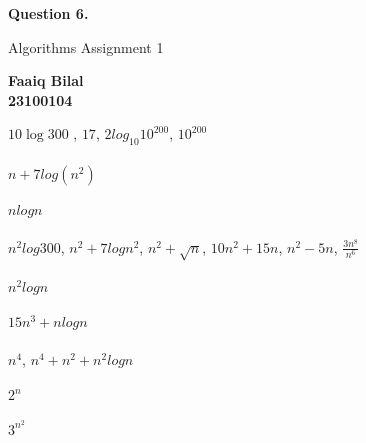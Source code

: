 \documentclass[]{article}
\begin{document}
\begin{center}
    \vspace*{1cm}

    \textbf{Question 6.}

    \vspace{0.5cm}
     Algorithms Assignment 1

    \vspace{0.15cm}

    \textbf{Faaiq Bilal} \\ 
    \textbf{23100104}
         
\end{center}
$10 \log 300 $ , $17$, $2log_{10} 10^{200}$, $10^{200}$ \\ \\
$ n + 7 log(n^2) $ \\ \\
$ n log n$ \\ \\
$ n^2 log 300 $, $n^2 + 7 log n^2$, $n^2 + \sqrt{n}$, $10n^2 + 15n$, $n^2-5n$, $ \frac{3n^8}{n^6} $ \\ \\
$ n^2 log n$ \\ \\
$ 15 n^3 + n log n $ \\ \\
$ n^4 $, $n^4 + n^2 + n^2 log n$ \\ \\
$ 2^n$ \\ \\ 
$3^{n^2}$ 
\end{document}
